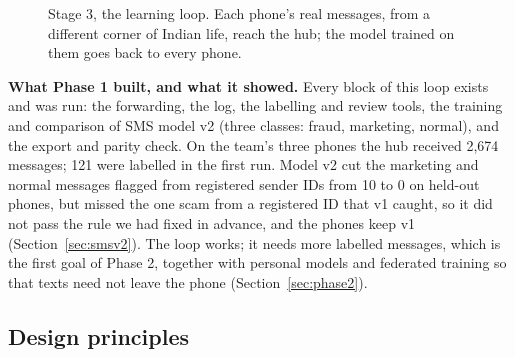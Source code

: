 \documentclass[11pt,a4paper]{article}
\begin{document}
\begin{figure}[H]
\centering
{}
\caption{Stage 3, the learning loop. Each phone's real messages, from a different corner of Indian life,
reach the hub; the model trained on them goes back to every phone.}
\label{fig:loop}
\end{figure}

\textbf{What Phase 1 built, and what it showed.} Every block of this loop exists and was run: the forwarding,
the log, the labelling and review tools, the training and comparison of SMS model v2 (three classes: fraud,
marketing, normal), and the export and parity check. On the team's three phones the hub received 2,674
messages; 121 were labelled in the first run. Model v2 cut the marketing and normal messages flagged from
registered sender IDs from 10 to 0 on held-out phones, but missed the one scam from a registered ID that v1
caught, so it did not pass the rule we had fixed in advance, and the phones keep v1
(Section~\ref{sec:smsv2}). The loop works; it needs more labelled messages, which is the first goal of
Phase 2, together with personal models and federated training so that texts need not leave the phone
(Section~\ref{sec:phase2}).

\subsection{Design principles}
\end{document}
